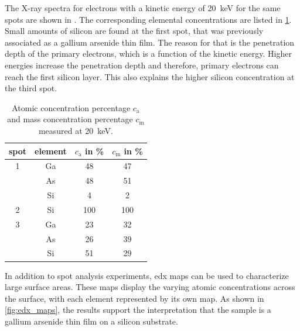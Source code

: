 The X-ray spectra for electrons with a kinetic energy of
\qty{20}{\kilo \electronvolt} for the same spots are shown
in .
The corresponding elemental concentrations are listed in
\cref{tab:edx_2}.
Small amounts of silicon are found at the first spot,
that was previously associated as a gallium arsenide thin film.
The reason for that is the penetration depth of the primary electrons,
which is a function of the kinetic energy.
Higher energies increase the penetration depth and therefore, primary
electrons can reach the first silicon layer.
This also explains the higher silicon concentration at the third spot.

\begin{table}
	\centering
	\begin{tabular}{cccc}
		\toprule
		spot & element & $c_\mathrm{a}$ in \unit{\percent } & $c_\mathrm{m}$ in \unit{\percent} \\
		\midrule
		1    & Ga      & 48                                 & 47                                \\
		     & As      & 48                                 & 51                                \\
		     & Si      & 4                                  & 2                                 \\
		\midrule
		2    & Si      & 100                                & 100                               \\
		\midrule
		3    & Ga      & 23                                 & 32                                \\
		     & As      & 26                                 & 39                                \\
		     & Si      & 51                                 & 29                                \\
		\bottomrule
	\end{tabular}
	\caption{Atomic concentration percentage $c_\mathrm{a}$ and mass
		concentration percentage $c_\mathrm{m}$ measured at
		\qty{20}{\kilo\electronvolt}.}
	\label{tab:edx_2}
\end{table}

In addition to spot analysis experiments, \ac{edx} maps can be used to
characterize large surface areas.
These maps display the varying atomic concentrations across the
surface, with each element represented by its own map.
As shown in \cref{fig:edx_maps}, the results support the
interpretation that the sample is a gallium arsenide thin film
on a silicon substrate.

